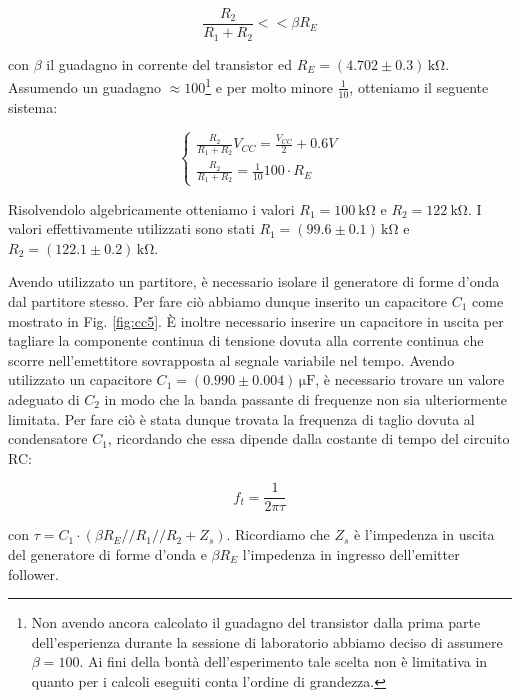\begin{equation}
\frac{R_2}{R_1+R_2} <<\beta R_E
\label{partitore2}
\end{equation}

con $\beta$ il guadagno in corrente del transistor ed $R_E=(4.702\pm0.3)\,\si{\kilo\ohm}$. Assumendo un guadagno $\approx 100$\footnote{Non avendo ancora calcolato il guadagno del transistor dalla prima parte dell'esperienza durante la sessione di laboratorio abbiamo deciso di assumere $\beta=100$. Ai fini della bontà dell'esperimento tale scelta non è limitativa in quanto per i calcoli eseguiti conta l'ordine di grandezza.} e per molto minore $\frac{1}{10}$, otteniamo il seguente sistema:

\begin{equation}
\begin{cases}
\frac{R_2}{R_1+R_2} V_{CC}=\frac{V_{CC}}{2} + 0.6V\\
\frac{R_2}{R_1+R_2} =\frac{1}{10} 100 \cdot R_E
\end{cases}
\end{equation}

Risolvendolo algebricamente otteniamo i valori $R_1=\SI{100}{\kilo\ohm}$ e $R_2=\SI{122}{\kilo\ohm}$. I valori effettivamente utilizzati sono stati $R_1=(99.6\pm0.1)\,\si{\kilo\ohm}$ e $R_2=(122.1\pm0.2)\,\si{\kilo\ohm}$.

Avendo utilizzato un partitore, è necessario isolare il generatore di forme d'onda dal partitore stesso. Per fare ciò abbiamo dunque inserito un capacitore $C_1$ come mostrato in Fig. \ref{fig:cc5}.
\`E inoltre necessario inserire un capacitore in uscita per tagliare la componente continua di tensione dovuta alla corrente continua che scorre nell'emettitore sovrapposta al segnale variabile nel tempo. 
Avendo utilizzato un capacitore $C_1=(0.990\pm0.004)\,\si{\micro\farad}$, è necessario trovare un valore adeguato di $C_2$ in modo che la banda passante di frequenze non sia ulteriormente limitata. Per fare ciò è stata dunque trovata la frequenza di taglio dovuta al condensatore $C_1$, ricordando che essa dipende dalla costante di tempo del circuito RC:

\begin{equation}
f_t=\frac{1}{2\pi \tau} 
\label{taglio}
\end{equation}

con $\tau=C_1 \cdot (\beta R_E//R_1//R_2+Z_s)$. Ricordiamo che $Z_s$ è l'impedenza in uscita del generatore di forme d'onda e $\beta R_E$ l'impedenza in ingresso dell'emitter follower.

